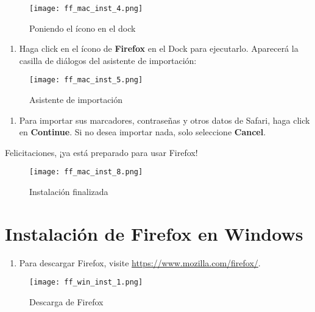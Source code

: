 \documentclass[10pt,a5paper,twoside,,]{book}
\providecommand{\tightlist}{%
  \setlength{\itemsep}{0pt}\setlength{\parskip}{0pt}}
\begin{document}
\begin{figure}[htbp]
\centering
\texttt{[image: ff\_mac\_inst\_4.png]}
\caption{Poniendo el ícono en el dock}
\end{figure}

\begin{enumerate}
\def\labelenumi{\arabic{enumi}.}
\setcounter{enumi}{6}
\tightlist
\item
  Haga click en el ícono de \textbf{Firefox} en el Dock para ejecutarlo.
  Aparecerá la casilla de diálogos del asistente de importación:
\end{enumerate}

\begin{figure}[htbp]
\centering
\texttt{[image: ff\_mac\_inst\_5.png]}
\caption{Asistente de importación}
\end{figure}

\begin{enumerate}
\def\labelenumi{\arabic{enumi}.}
\setcounter{enumi}{7}
\tightlist
\item
  Para importar sus marcadores, contraseñas y otros datos de Safari,
  haga click en \textbf{Continue}. Si no desea importar nada, solo
  seleccione \textbf{Cancel}.
\end{enumerate}

Felicitaciones, ¡ya está preparado para usar Firefox!

\begin{figure}[htbp]
\centering
\texttt{[image: ff\_mac\_inst\_8.png]}
\caption{Instalación finalizada}
\end{figure}

\chapter{Instalación de Firefox en
Windows}\label{instalaciuxf3n-de-firefox-en-windows}

\begin{enumerate}
\def\labelenumi{\arabic{enumi}.}
\tightlist
\item
  Para descargar Firefox, visite \url{https://www.mozilla.com/firefox/}.
\end{enumerate}

\begin{figure}[htbp]
\centering
\texttt{[image: ff\_win\_inst\_1.png]}
\caption{Descarga de Firefox}
\end{figure}
\end{document}
